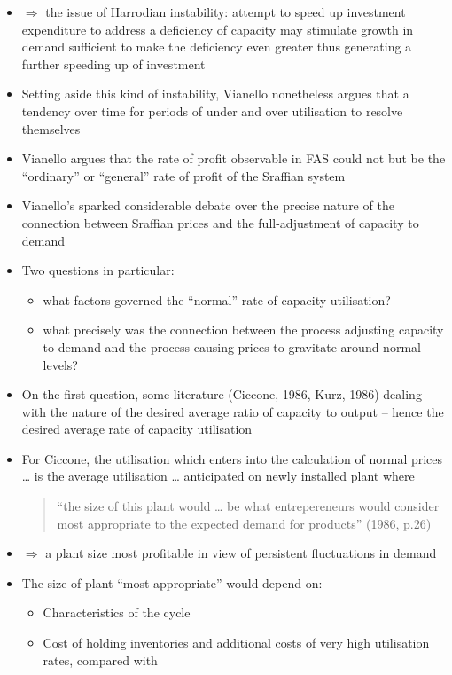 \documentclass{article}
\begin{document}
\begin{itemize}
		\item \( \Rightarrow \) the issue of Harrodian instability: attempt to speed up investment expenditure to address a deficiency of capacity may stimulate growth in demand sufficient to make the deficiency even greater thus generating a further speeding up of investment
		\item Setting aside this kind of instability, Vianello nonetheless argues that a tendency over time for periods of under and over utilisation to resolve themselves
		\item Vianello argues that the rate of profit observable in FAS could not but be the ``ordinary'' or ``general'' \textcolor{myred}{rate of profit} of the Sraffian system
		\item Vianello's sparked considerable debate over the precise nature of the connection between Sraffian prices and the full-adjustment of capacity to demand
		\item Two questions in particular:
		\begin{itemize}
			\item what factors governed the ``normal'' rate of capacity utilisation?
			\item what precisely was the connection between the process adjusting capacity to demand and the process causing prices to gravitate around normal levels?
		\end{itemize}
		\item On the first question, some literature (Ciccone, 1986, Kurz, 1986) dealing with the nature of the desired average ratio of capacity to output -- hence the desired average rate of capacity utilisation
		\item For Ciccone, the utilisation which enters into the calculation of normal prices \dots\: is the average utilisation \dots\: anticipated on newly installed plant where
		\begin{quote}
			``the size of this plant would … be what entrepereneurs would consider most appropriate to the expected demand for products''  (1986, p.26)
		\end{quote}
		\item \( \Rightarrow \) a plant size most profitable in view of persistent fluctuations in demand
		\item The size of plant ``most appropriate'' would depend on:
		\begin{itemize}
			\item Characteristics of the cycle
			\item Cost of holding inventories and additional costs of very high utilisation rates, compared with

\end{itemize}
\end{itemize}
\end{document}
